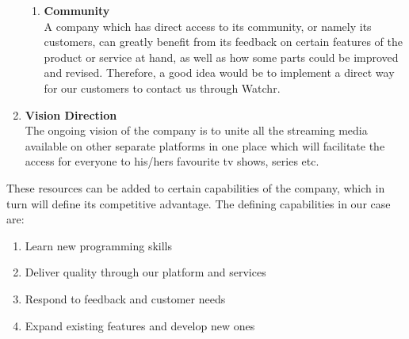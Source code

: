 \begin{enumerate}
\begin{enumerate}
        	\item \textbf{Community}\\
A company which has direct access to its community, or namely its customers, can greatly benefit from its feedback on certain features of the product or service at hand, as well as how some parts could be improved and revised. Therefore, a good idea would be to implement a direct way for our customers to contact us through Watchr.
    \end{enumerate}
  \item \textbf{Vision Direction}\\
The ongoing vision of the company is to unite all the streaming media available on other separate platforms in one place which will facilitate the access for everyone to his/hers favourite tv shows, series etc.
\end{enumerate}

These resources can be added to certain capabilities of the company, which in turn will define its competitive advantage. The defining capabilities in our case are:

\begin{enumerate}
  \item Learn new programming skills
  \item Deliver quality through our platform and services
  \item Respond to feedback and customer needs
  \item Expand existing features and develop new ones
\end{enumerate}